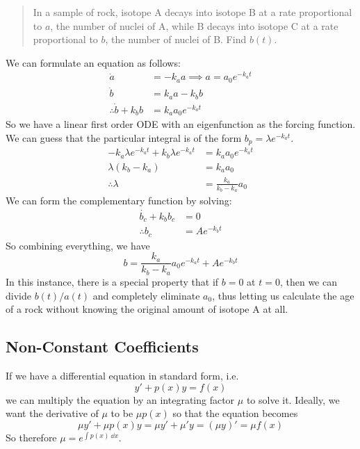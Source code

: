 \begin{quote}
	In a sample of rock, isotope A decays into isotope B at a rate proportional to \(a\), the number of nuclei of A, while B decays into isotope C at a rate proportional to \(b\), the number of nuclei of B.
	Find \(b(t)\).
\end{quote}

\noindent We can formulate an equation as follows:
\begin{align*}
	\dot a                    & = -k_a a \implies a = a_0 e^{-k_a t} \\
	\dot b                    & = k_a a - k_b b                      \\
	\therefore \dot b + k_b b & = k_a a_0 e^{-k_a t}
\end{align*}
\noindent So we have a linear first order ODE with an eigenfunction as the forcing function.
We can guess that the particular integral is of the form \(b_p = \lambda e^{-k_a t}\).
\begin{align*}
	-k_a\lambda e^{-k_a t} + k_b \lambda e^{-k_a t} & = k_a a_0 e^{-k_a t}        \\
	\lambda(k_b-k_a)                                & = k_a a_0                   \\
	\therefore \lambda                              & = \frac{k_a}{k_b - k_a} a_0
\end{align*}
We can form the complementary function by solving:
\begin{align*}
	\dot{b_c} + k_b b_c & = 0           \\
	\therefore b_c      & = Ae^{-k_b t}
\end{align*}
So combining everything, we have
\[
	b = \frac{k_a}{k_b - k_a} a_0 e^{-k_a t} + Ae^{-k_b t}
\]
In this instance, there is a special property that if \(b=0\) at \(t=0\), then we can divide \(b(t)/a(t)\) and completely eliminate \(a_0\), thus letting us calculate the age of a rock without knowing the original amount of isotope A at all.

\subsection{Non-Constant Coefficients}
If we have a differential equation in standard form, i.e.
\[
	y' + p(x)y = f(x)
\]
we can multiply the equation by an integrating factor \(\mu\) to solve it.
Ideally, we want the derivative of \(\mu\) to be \(\mu p(x)\) so that the equation becomes
\[
	\mu y' + \mu p(x) y = \mu y' + \mu' y = (\mu y)' = \mu f(x)
\]
So therefore \(\mu = e^{\int p(x)\ \dd{x}}\).
